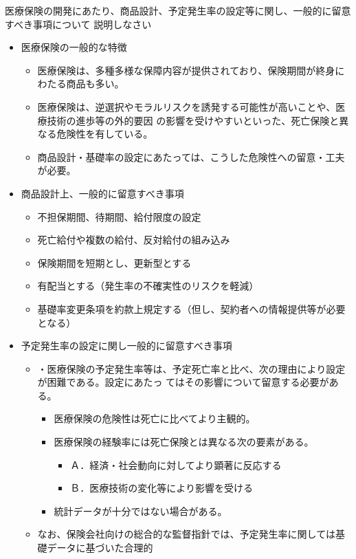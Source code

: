 \documentclass[report,gutter=10mm,fore-edge=10mm,uplatex,dvipdfmx]{jlreq}
\begin{document}
医療保険の開発にあたり、商品設計、予定発生率の設定等に関し、一般的に留意すべき事項について
説明しなさい
\begin{itemize}
 \item 医療保険の一般的な特徴
\begin{itemize}
 \item 医療保険は、多種多様な保障内容が提供されており、保険期間が終身にわたる商品も多い。
 \item 医療保険は、逆選択やモラルリスクを誘発する可能性が高いことや、医療技術の進歩等の外的要因
の影響を受けやすいといった、死亡保険と異なる危険性を有している。
 \item 商品設計・基礎率の設定にあたっては、こうした危険性への留意・工夫が必要。
\end{itemize}
 \item 商品設計上、一般的に留意すべき事項
\begin{itemize}
 \item 不担保期間、待期間、給付限度の設定
 \item 死亡給付や複数の給付、反対給付の組み込み
 \item 保険期間を短期とし、更新型とする
 \item 有配当とする（発生率の不確実性のリスクを軽減）
 \item 基礎率変更条項を約款上規定する（但し、契約者への情報提供等が必要となる）
\end{itemize}
 \item 予定発生率の設定に関し一般的に留意すべき事項
\begin{itemize}
 \item 
・医療保険の予定発生率等は、予定死亡率と比べ、次の理由により設定が困難である。設定にあたっ
てはその影響について留意する必要がある。
\begin{itemize}
 \item 医療保険の危険性は死亡に比べてより主観的。
 \item  医療保険の経験率には死亡保険とは異なる次の要素がある。
\begin{itemize}
 \item Ａ．経済・社会動向に対してより顕著に反応する
 \item Ｂ．医療技術の変化等により影響を受ける
\end{itemize}
 \item  統計データが十分ではない場合がある。
\end{itemize}
 \item  なお、保険会社向けの総合的な監督指針では、予定発生率に関しては基礎データに基づいた合理的

\end{itemize}
\end{itemize}
\end{document}
